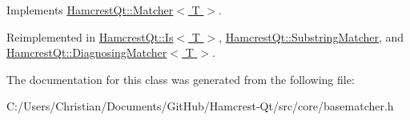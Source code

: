 Implements \hyperlink{class_hamcrest_qt_1_1_matcher_aa92292613ca3c83f0501d261de94cb2b}{Hamcrest\-Qt\-::\-Matcher$<$ T $>$}.



Reimplemented in \hyperlink{class_hamcrest_qt_1_1_is_a3a8c6b52b2b0636e24b60542359ba12e}{Hamcrest\-Qt\-::\-Is$<$ T $>$}, \hyperlink{class_hamcrest_qt_1_1_substring_matcher_a23bb6d4b756dd8745a883eb88a993a2b}{Hamcrest\-Qt\-::\-Substring\-Matcher}, and \hyperlink{class_hamcrest_qt_1_1_diagnosing_matcher_a122cccc22b8be886b3202e0a126995ed}{Hamcrest\-Qt\-::\-Diagnosing\-Matcher$<$ T $>$}.



The documentation for this class was generated from the following file\-:\begin{DoxyCompactItemize}
\item 
C\-:/\-Users/\-Christian/\-Documents/\-Git\-Hub/\-Hamcrest-\/\-Qt/src/core/basematcher.\-h\end{DoxyCompactItemize}
